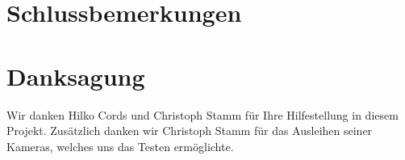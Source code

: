 \section{Schlussbemerkungen}

\lipsum[28]


\section{Danksagung}

Wir danken Hilko Cords und Christoph Stamm für Ihre Hilfestellung in diesem Projekt. Zusätzlich danken wir Christoph Stamm für das Ausleihen seiner Kameras, welches uns das Testen ermöglichte.